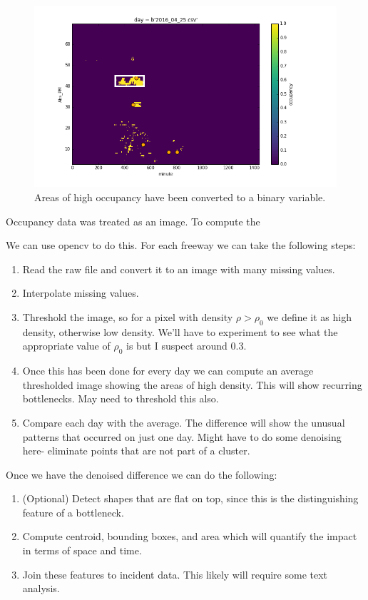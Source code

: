 \documentclass[12pt]{article}
\begin{document}
\begin{figure}
    \label{fig:thresh}
    \centering
    \includegraphics[scale=0.5]{../thresh.png}
    \caption{Areas of high occupancy have been converted to a binary
    variable.}
\end{figure}


Occupancy data was treated as an image. To compute the 

We can use opencv to do this. For each freeway we can take the following
steps:
\begin{enumerate}
    \item Read the raw file and convert it to an image with many missing
        values. 
    \item Interpolate missing values. 
    \item Threshold the image, so for a pixel with density $\rho >
        \rho_0$
        we define it as high density, otherwise low density. We'll
        have to experiment to see what the appropriate value of $\rho_0$ is
        but I suspect around 0.3.
    \item Once this has been done for every day we can compute an average
        thresholded image showing the areas of high density. This will show
        recurring bottlenecks. May need to threshold this also.
    \item Compare each day with the average. The difference will show the
        unusual patterns that occurred on just one day. Might have to do
        some denoising here- eliminate points that are not part of a 
        cluster.
\end{enumerate}

Once we have the denoised difference we can do the following:
\begin{enumerate}
    \item (Optional) Detect shapes that are flat on top, since this is the
        distinguishing feature of a bottleneck.
    \item Compute centroid, bounding boxes, and area which will quantify the impact
        in terms of space and time.
    \item Join these features to incident data. This likely will require some text
        analysis.
\end{enumerate}
\end{document}
